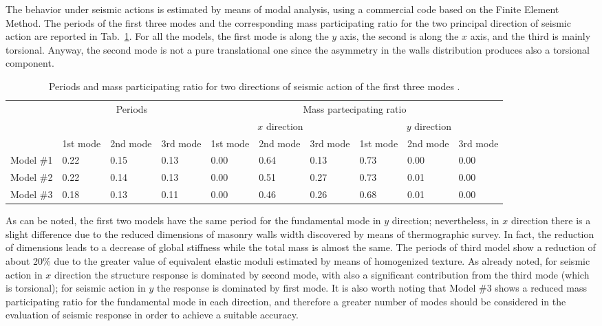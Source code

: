 \documentclass[11pt,a4paper]{article}
\begin{document}
The behavior under seismic actions is estimated by means of modal analysis, using a commercial code based on the Finite Element Method.
The periods of the first three modes and the corresponding mass participating ratio  for the two principal direction of seismic action are reported in Tab.~\ref{tab:periodi_masse}.
For all the models, the first mode is along the $y$ axis, the second is along the $x$ axis, and the third is mainly torsional. 
Anyway, the second mode is not a pure translational one since the asymmetry in the walls distribution produces also a torsional component. 

\begin{table}[h!]
\center
{\small
\begin{tabular}{c|p{0.7cm}p{0.7cm}p{0.7cm}|p{0.7cm}p{0.7cm}p{0.7cm}|p{0.7cm}p{0.7cm}p{0.7cm}}
\hline
& \multicolumn{3}{|c|}{Periods}
 & \multicolumn{6}{|c}{Mass partecipating ratio} \\
 & \multicolumn{3}{|c|}{ }
  & \multicolumn{3}{|c|}{ $x$ direction} &    \multicolumn{3}{|c}{$y$ direction} \\
 & 1st mode & 2nd mode & 3rd mode  & 1st mode & 2nd mode & 3rd mode  & 1st mode & 2nd mode & 3rd mode\\
\hline
 Model \#1 & 0.22 & 0.15 & 0.13 & 0.00 & 0.64 & 0.13 & 0.73 & 0.00 & 0.00 \\
 Model \#2 & 0.22 & 0.14 & 0.13 & 0.00 & 0.51 & 0.27 & 0.73 & 0.01 & 0.00 \\
 Model \#3 & 0.18 & 0.13 & 0.11 & 0.00 & 0.46 & 0.26 & 0.68 & 0.01 & 0.00 \\
 \hline\end{tabular}
}
\caption{{\small Periods and mass participating ratio for two directions of seismic action of the first three modes .}}
\label{tab:periodi_masse}
\end{table}

As can be noted, the first two models have the same period for the fundamental mode in $y$ direction; nevertheless, in $x$ direction there is a slight difference due to the reduced dimensions of masonry walls width discovered by means of thermographic survey. In fact, the reduction of dimensions leads to a decrease of global stiffness while the total mass is almost the same.  
The periods of third model show a reduction of about 20\% due to  the greater value of equivalent elastic moduli estimated by means of homogenized texture.
As already noted, for seismic action in $x$ direction the structure response is dominated by second mode, with also a significant contribution from the third mode (which is torsional); for seismic action in $y$ the response is dominated by first mode.
It is also worth noting that Model \#3 shows a reduced mass participating ratio for the fundamental mode in each direction, and therefore a greater number of modes should be considered in the evaluation of seismic response in order to achieve a suitable accuracy. 
\end{document}
